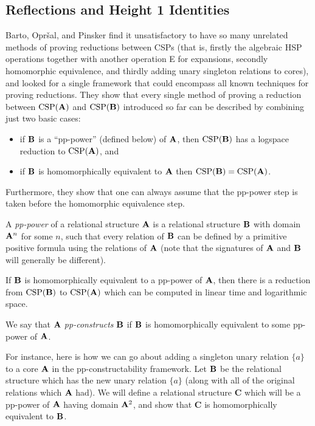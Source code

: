 \documentclass[letterpaper,11pt]{article}
\DeclareMathOperator{\CSP}{CSP}
\begin{document}
\subsection{Reflections and Height 1 Identities}

Barto, Opr{\v{s}}al, and Pinsker \cite{barto-reflections} find it unsatisfactory to have so many unrelated methods of proving reductions between CSPs (that is, firstly the algebraic HSP operations together with another operation E for expansions, secondly homomorphic equivalence, and thirdly adding unary singleton relations to cores), and looked for a single framework that could encompass all known techniques for proving reductions. They show that every single method of proving a reduction between $\CSP(\fA)$ and $\CSP(\fB)$ introduced so far can be described by combining just two basic cases:
\begin{itemize}
\item if $\mathbf{B}$ is a ``pp-power'' (defined below) of $\mathbf{A}$, then $\CSP(\fB)$ has a logspace reduction to $\CSP(\fA)$, and

\item if $\mathbf{B}$ is homomorphically equivalent to $\mathbf{A}$ then $\CSP(\fB) = \CSP(\fA)$.
\end{itemize}
Furthermore, they show that one can always assume that the pp-power step is taken before the homomorphic equivalence step.

\begin{defn} A \emph{pp-power} of a relational structure $\mathbf{A}$ is a relational structure $\mathbf{B}$ with domain $\mathbf{A}^n$ for some $n$, such that every relation of $\mathbf{B}$ can be defined by a primitive positive formula using the relations of $\mathbf{A}$ (note that the signatures of $\mathbf{A}$ and $\mathbf{B}$ will generally be different).
\end{defn}

\begin{prop} If $\mathbf{B}$ is homomorphically equivalent to a pp-power of $\mathbf{A}$, then there is a reduction from $\CSP(\fB)$ to $\CSP(\fA)$ which can be computed in linear time and logarithmic space.%
\end{prop}

\begin{defn}\label{defn-pp-construct} We say that $\mathbf{A}$ \emph{pp-constructs} $\mathbf{B}$ if $\mathbf{B}$ is homomorphically equivalent to some pp-power of $\mathbf{A}$.
\end{defn}

For instance, here is how we can go about adding a singleton unary relation $\{a\}$ to a core $\mathbf{A}$ in the pp-constructability framework. Let $\mathbf{B}$ be the relational structure which has the new unary relation $\{a\}$ (along with all of the original relations which $\mathbf{A}$ had). We will define a relational structure $\mathbf{C}$ which will be a pp-power of $\mathbf{A}$ having domain $\mathbf{A}^2$, and show that $\mathbf{C}$ is homomorphically equivalent to $\mathbf{B}$.
\end{document}
